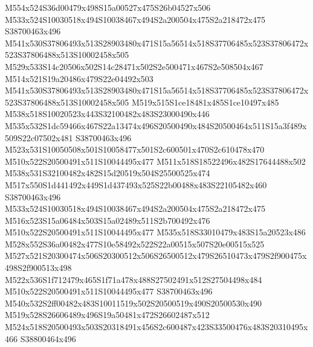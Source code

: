 \documentclass{article}
\begin{document}
\begin{multicols}{2}
M554x524S36d00479x498S15a00527x475S26b04527x506 M533x524S10030518x494S10038467x494S2a200504x475S2a218472x475 S38700463x496 M541x530S37806493x513S28903480x471S15a56514x518S37706485x523S37806472x523S37806488x513S10002458x505 M529x533S14c20506x502S14c28471x502S2e500471x467S2e508504x467 M514x521S19a20486x479S22e04492x503 M541x530S37806493x513S28903480x471S15a56514x518S37706485x523S37806472x523S37806488x513S10002458x505 M519x515S1ce18481x485S1ce10497x485 M538x518S10020523x443S32100482x483S23000490x446 M535x532S1dc59466x467S22a13474x496S20500490x484S20500464x511S15a3f489x509S22c07502x481 S38700463x496 M523x531S10050508x501S10058477x501S2c600501x470S2c610478x470 M510x522S20500491x511S10044495x477 M511x518S18522496x482S17644488x502 M538x531S32100482x482S15d20519x504S25500525x474 M517x550S1d441492x449S1d437493x525S22b00488x483S22105482x460 S38700463x496 M533x524S10030518x494S10038467x494S2a200504x475S2a218472x475 M516x523S15a06484x503S15a02489x511S2b700492x476 M510x522S20500491x511S10044495x477 M535x518S33010479x483S15a20523x486 M528x552S36a00482x477S10e58492x522S22a00515x507S20e00515x525 M527x521S20300474x506S20300512x506S26500512x479S26510473x479S2f900475x498S2f900513x498 M522x536S1f712479x465S1f71a478x488S27502491x512S27504498x484 M510x522S20500491x511S10044495x477 S38700463x496 M540x532S2ff00482x483S10011519x502S20500519x490S20500530x490 M519x528S26606489x496S19a50481x472S26602487x512 M524x518S20500493x503S20318491x456S2c600487x423S33500476x483S20310495x466 S38800464x496







\end{multicols}
\end{document}

